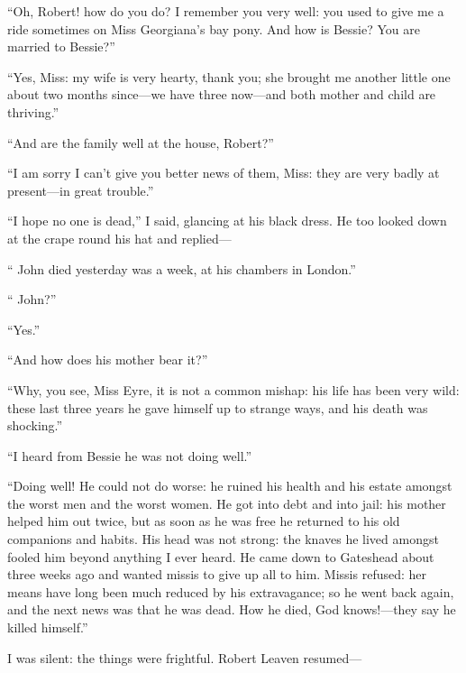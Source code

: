 \enquote{Oh, Robert! how do you do? I remember you very well: you used
	to give me a ride sometimes on Miss Georgiana's bay pony. And how is
	Bessie? You are married to Bessie?}

\enquote{Yes, Miss: my wife is very hearty, thank you; she brought me
	another little one about two months since---we have three now---and both
	mother and child are thriving.}

\enquote{And are the family well at the house, Robert?}

\enquote{I am sorry I can't give you better news of them, Miss: they are
	very badly at present---in great trouble.}

\enquote{I hope no one is dead,} I said, glancing at his black dress.
He too looked down at the crape round his hat and replied---

\enquote{\Mr{} John died yesterday was a week, at his chambers in London.}

\enquote{\Mr{} John?}

\enquote{Yes.}

\enquote{And how does his mother bear it?}

\enquote{Why, you see, Miss Eyre, it is not a common mishap: his life
	has been very wild: these last three years he gave himself up to strange
	ways, and his death was shocking.}

\enquote{I heard from Bessie he was not doing well.}

\enquote{Doing well! He could not do worse: he ruined his health and
	his estate amongst the worst men and the worst women. He got into debt
	and into jail: his mother helped him out twice, but as soon as he was
	free he returned to his old companions and habits. His head was not
	strong: the knaves he lived amongst fooled him beyond anything I ever
	heard. He came down to Gateshead about three weeks ago and wanted
	missis to give up all to him. Missis refused: her means have long been
	much reduced by his extravagance; so he went back again, and the next
	news was that he was dead. How he died, God knows!---they say he killed
	himself.}

I was silent: the things were frightful. Robert Leaven resumed---

